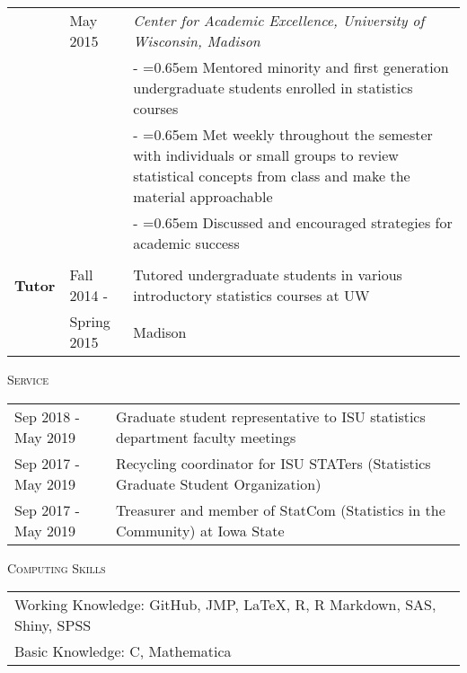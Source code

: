 \documentclass[10pt, oneside]{article}
\begin{document}
\begin{longtable}{p{1.4cm}p{2.1cm}p{13cm}}
& \hfill{May 2015} & \emph{Center for Academic Excellence, University of Wisconsin, Madison} \vspace{0.1cm}\\
& & - \hangindent=0.65em \hangafter=1 Mentored minority and first generation undergraduate students enrolled in statistics courses\\
& & - \hangindent=0.65em \hangafter=1 Met weekly throughout the semester with individuals or small groups to review statistical concepts from class and make the material approachable\\
& & - \hangindent=0.65em \hangafter=1 Discussed and encouraged strategies for academic success\\
\\
\textbf{Tutor} & \hfill{Fall 2014 -} & Tutored undergraduate students in various introductory statistics courses at UW \\
& \hfill{Spring 2015} & Madison
\end{longtable}

\noindent \textsc{Service} \hrulefill
\begin{longtable}{p{3.5cm}p{13cm}}
\hfill{Sep 2018 - May 2019} & Graduate student representative to ISU statistics department faculty meetings\\
\hfill{Sep 2017 - May 2019} & Recycling coordinator for ISU STATers (Statistics Graduate Student Organization)\\
\hfill{Sep 2017 - May 2019} & Treasurer and member of StatCom (Statistics in the Community) at Iowa State
\end{longtable}

\noindent \textsc{Computing Skills} \hrulefill
\begin{longtable}{p{16.5cm}}
Working Knowledge: GitHub, JMP, \LaTeX, R, R Markdown, SAS, Shiny, SPSS\\
Basic Knowledge: C, Mathematica
\end{longtable}
\end{document}
